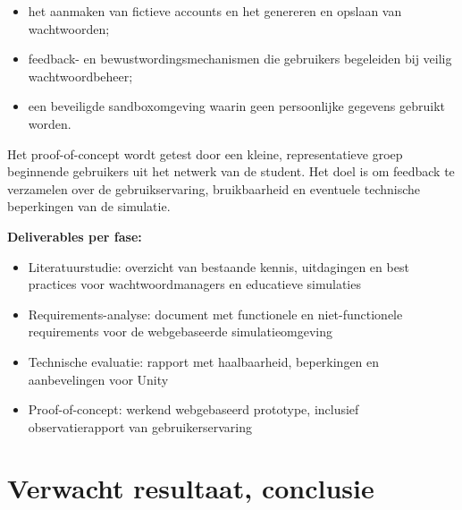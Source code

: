 \begin{enumerate}
    \begin{itemize}
        \item het aanmaken van fictieve accounts en het genereren en opslaan van wachtwoorden;
        \item feedback- en bewustwordingsmechanismen die gebruikers begeleiden bij veilig wachtwoordbeheer;
        \item een beveiligde sandboxomgeving waarin geen persoonlijke gegevens gebruikt worden.
    \end{itemize} 
    Het proof-of-concept wordt getest door een kleine, representatieve groep beginnende gebruikers uit het netwerk van de student. Het doel is om feedback te verzamelen over de gebruikservaring, bruikbaarheid en eventuele technische beperkingen van de simulatie.
  \end{enumerate}

\textbf{Deliverables per fase:}
\begin{itemize}
    \item Literatuurstudie: overzicht van bestaande kennis, uitdagingen en best practices voor wachtwoordmanagers en educatieve simulaties
    \item Requirements-analyse: document met functionele en niet-functionele requirements voor de webgebaseerde simulatieomgeving
    \item Technische evaluatie: rapport met haalbaarheid, beperkingen en aanbevelingen voor Unity 
    \item Proof-of-concept: werkend webgebaseerd prototype, inclusief observatierapport van gebruikerservaring
\end{itemize}


\section{Verwacht resultaat, conclusie}%
\label{sec:verwachte_resultaten}


